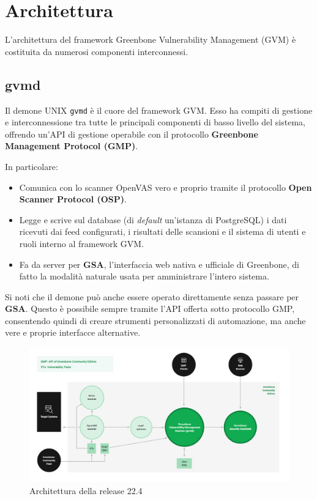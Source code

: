 \section{Architettura}
L'architettura del framework Greenbone Vulnerability Management (GVM) è costituita da numerosi componenti interconnessi.

\subsection{gvmd}
Il demone UNIX \texttt{gvmd} è il cuore del framework GVM. Esso ha compiti di gestione e interconnessione tra tutte le principali componenti di basso livello del sistema, offrendo un'API di gestione operabile con il protocollo \textbf{Greenbone Management Protocol (GMP)}.

In particolare:
\begin{itemize}
    \item Comunica con lo scanner OpenVAS vero e proprio tramite il protocollo \textbf{Open Scanner Protocol (OSP)}.
    \item Legge e scrive sul database (di \emph{default} un'istanza di PostgreSQL) i dati ricevuti dai feed configurati, i risultati delle scansioni e il sistema di utenti e ruoli interno al framework GVM.
    \item Fa da server per \textbf{GSA}, l'interfaccia web nativa e ufficiale di Greenbone, di fatto la modalità naturale usata per amministrare l'intero sistema.
\end{itemize}

Si noti che il demone può anche essere operato direttamente senza passare per \textbf{GSA}. Questo è possibile sempre tramite l'API offerta sotto protocollo GMP, consentendo quindi di creare strumenti personalizzati di automazione, ma anche vere e proprie interfacce alternative.

\begin{figure}
    \includegraphics[width=\textwidth]{img/greenbone-community-22.4-architecture.png}
    \caption{Architettura della release 22.4}
\end{figure}

